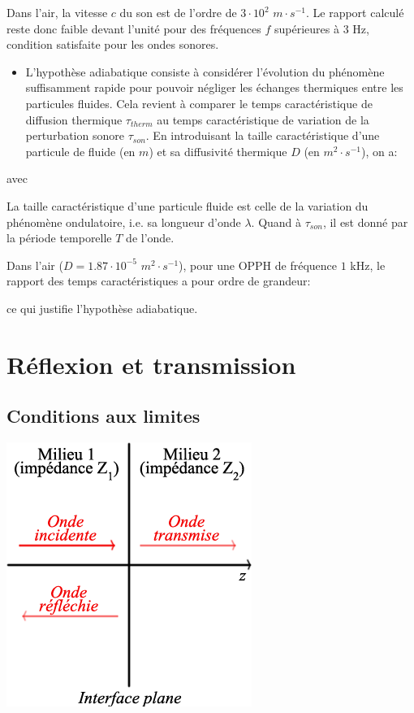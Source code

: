 \documentclass[a4paper, 12pt]{article}
\begin{document}
Dans l'air, la vitesse $c$ du son est de l'ordre de $3\cdot 10^{2}$ $m\cdot s^{-1}$. Le rapport calculé reste donc faible devant l'unité pour des fréquences $f$ supérieures à $3$ Hz, condition satisfaite pour les ondes sonores.

\begin{itemize}
\item L'hypothèse adiabatique consiste à considérer l'évolution du phénomène suffisamment rapide pour pouvoir négliger les échanges thermiques entre les particules fluides. Cela revient à comparer le temps caractéristique de diffusion thermique $\tau_{therm}$ au temps caractéristique de variation de la perturbation sonore $\tau_{son}$. En introduisant la taille caractéristique d'une particule de fluide (en $m$) et sa diffusivité thermique $D$ (en $m^{2}\cdot s^{-1}$), on a:
\end{itemize}
\begin{center}
 avec 
\end{center}

La taille caractéristique d'une particule fluide est celle de la variation du phénomène ondulatoire, i.e. sa longueur d'onde $\lambda$. Quand à $\tau_{son}$, il est donné par la période temporelle $T$ de l'onde.

Dans l'air ($D = 1.87\cdot 10^{-5}$ $m^{2}\cdot s^{-1}$), pour une OPPH de fréquence $1$ kHz, le rapport des temps caractéristiques a pour ordre de grandeur:
\begin{center}
\end{center}

ce qui justifie l'hypothèse adiabatique.

\newpage
\section{Réflexion et transmission}

\subsection{Conditions aux limites}

\begin{center}
 {\includegraphics[scale=0.65]{ref_trans.png}}
\end{center}
\end{document}
